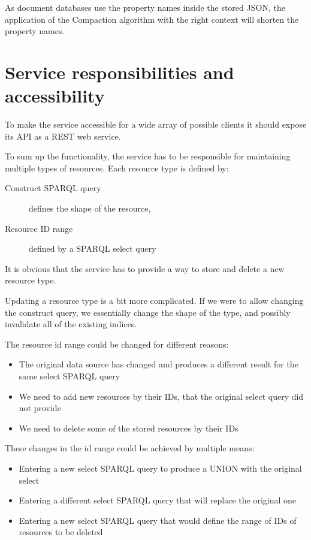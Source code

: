 
As document databases use the property names inside the stored JSON, the application of the Compaction algorithm with the right context will shorten the property names.


\section{Service responsibilities and accessibility}
To make the service accessible for a wide array of possible clients it should expose its API as a REST web service.

To sum up the functionality, the service has to be responsible for maintaining multiple types of resources.
Each resource type is defined by:
\begin{description}
	\item[Construct SPARQL query] defines the shape of the resource, 
	\item[Resource ID range] defined by a SPARQL select query
\end{description}
It is obvious that the service has to provide a way to store and delete a new resource type. 

Updating a resource type is a bit more complicated. If we were to allow changing the construct query, we essentially change the shape of the type, and possibly invalidate all of the existing indices. 

The resource id range could be changed for different reasons:
\begin{itemize}
	\item The original data source has changed and produces a different result for the same select SPARQL query
	\item We need to add new resources by their IDs, that the original select query did not provide
	\item We need to delete some of the stored resources by their IDs
\end{itemize}
These changes in the id range could be achieved by multiple means: 
\begin{itemize}
	\item Entering a new select SPARQL query to produce a UNION with the original select
	\item Entering a different select SPARQL query that will replace the original one
	\item Entering a new select SPARQL query that would define the range of IDs of resources to be deleted
\end{itemize}

